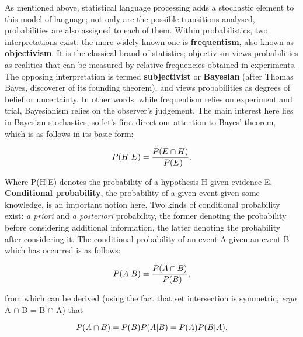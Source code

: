 As mentioned above, statistical language processing adds a stochastic element
to this model of language; not only are the possible transitions analysed,
probabilities are also assigned to each of them. Within probabilistics, two
interpretations exist: the more widely-known one is \textbf{frequentism}, also
known as \textbf{objectivism}. It is the classical brand of statistics;
objectivism views probabilities as realities that can be measured by relative
frequencies obtained in experiments. The opposing interpretation is termed
\textbf{subjectivist} or \textbf{Bayesian} (after Thomas Bayes, discoverer of
its founding theorem), and views probabilities as degrees of belief or
uncertainty. In other words, while frequentism relies on experiment and trial,
Bayesianism relies on the observer's judgement. The main interest here lies in
Bayesian stochastics, so let's first direct our attention to Bayes' theorem,
which is as follows in its basic form:

\begin{equation}
  \\P(H|E)=\frac{\\P(E \cap H)}{\\P(E)}.
\end{equation}

Where P(H|E) denotes the probability of a hypothesis H given evidence E.
\textbf{Conditional probability}, the probability of a given event given some
knowledge, is an important notion here. Two kinds of conditional probability
exist: \textit{a priori} and \textit{a posteriori} probability, the former
denoting the probability before considering additional information, the latter
denoting the probability after considering it. The conditional probability of
an event A given an event B which has occurred is as follows:

\begin{equation}
\\P(A|B) = \frac{\\P(A \cap B)}{\\P(B)},
\end{equation}

from which can be derived (using the fact that set intersection is symmetric,
\textit{ergo} A $\cap$ B = B $\cap$ A) that

\begin{equation}
\\P(A \cap B) = \\P(B)\\P(A|B) = \\P(A)\\P(B|A).
\end{equation}

